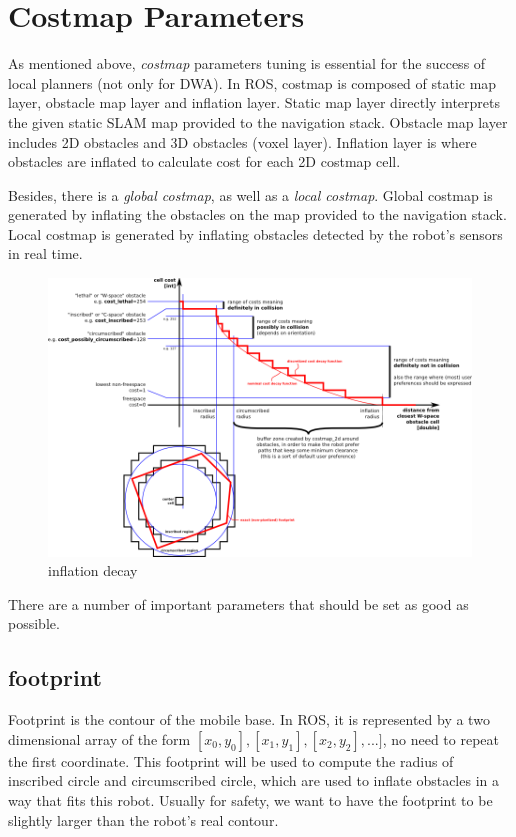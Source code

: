 \documentclass[12pt]{article}
\begin{document}
\section{Costmap Parameters}

As mentioned above, \textit{costmap} parameters tuning is essential for the success of local planners (not only for DWA). In ROS, costmap is composed of static map layer, obstacle map layer and inflation layer. Static map layer directly interprets the given static SLAM map provided to the navigation stack. Obstacle map layer includes 2D obstacles and 3D obstacles (voxel layer). Inflation layer is where obstacles are inflated to calculate cost for each 2D costmap cell.

Besides, there is a \textit{global costmap}, as well as a \textit{local costmap}. Global costmap is generated by inflating the obstacles on the map provided to the navigation stack. Local costmap is generated
by inflating obstacles detected by the robot's sensors in real time. \\

\begin{figure}[!h]
  \includegraphics[width=\linewidth]{costmapspec.png}
  \caption{inflation decay}
\end{figure}

\noindent There are a number of important parameters that should be set as good as possible.

\subsection{footprint} 
Footprint is the contour of the mobile base. In ROS, it is represented by a two dimensional array of the form $[x_0, y_0],[x_1,y_1],[x_2,y_2],...]$, no need to repeat the first coordinate. This footprint will be used to compute the radius of inscribed circle and circumscribed circle, which are used to inflate obstacles in a way that fits this robot. Usually for safety, we want to have the footprint to be slightly larger
than the robot's real contour.
\end{document}

